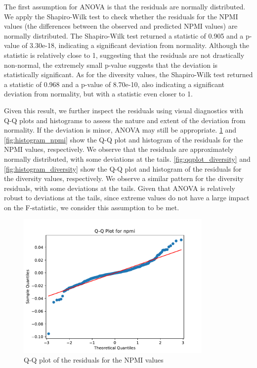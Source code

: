The first assumption for ANOVA is that the residuals are normally distributed. We apply the Shapiro-Wilk test to check whether the residuals for the NPMI values (the differences between the observed and predicted NPMI values) are normally distributed. The Shapiro-Wilk test returned a statistic of 0.905 and a p-value of 3.30e-18, indicating a significant deviation from normality. Although the statistic is relatively close to 1, suggesting that the residuals are not drastically non-normal, the extremely small p-value suggests that the deviation is statistically significant. As for the diversity values, the Shapiro-Wilk test returned a statistic of 0.968 and a p-value of 8.70e-10, also indicating a significant deviation from normality, but with a statistic even closer to 1.

Given this result, we further inspect the residuals using visual diagnostics with Q-Q plots and histograms to assess the nature and extent of the deviation from normality. If the deviation is minor, ANOVA may still be appropriate. \cref{fig:qqplot_npmi} and \cref{fig:histogram_npmi} show the Q-Q plot and histogram of the residuals for the NPMI values, respectively. We observe that the residuals are approximately normally distributed, with some deviations at the tails. \cref{fig:qqplot_diversity} and \cref{fig:histogram_diversity} show the Q-Q plot and histogram of the residuals for the diversity values, respectively. We observe a similar pattern for the diversity residuals, with some deviations at the tails. Given that ANOVA is relatively robust to deviations at the tails, since extreme values do not have a large impact on the F-statistic, we consider this assumption to be met.

\begin{figure}[h]
    \centering
    \includegraphics[width=0.85\textwidth]{figures/qqplot_npmi.pdf}
    \caption{Q-Q plot of the residuals for the NPMI values}
    \label{fig:qqplot_npmi}
\end{figure}


